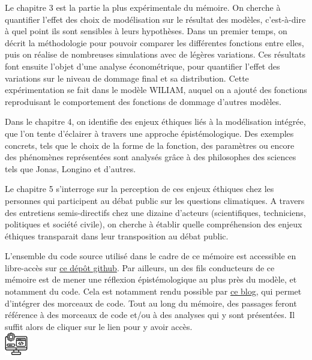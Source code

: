 Le chapitre 3 est la partie la plus expérimentale du mémoire. On cherche à quantifier l'effet des choix de modélisation sur le résultat des modèles, c'est-à-dire à quel point ils sont sensibles à leurs hypothèses. Dans un premier temps, on décrit la méthodologie pour pouvoir comparer les différentes fonctions entre elles, puis on réalise de nombreuses simulations avec de légères variations. Ces résultats font ensuite l'objet d'une analyse économétrique, pour quantifier l'effet des variations sur le niveau de dommage final et sa distribution. Cette expérimentation se fait dans le modèle WILIAM, auquel on a ajouté des fonctions reproduisant le comportement des fonctions de dommage d'autres modèles.

Dans le chapitre 4, on identifie des enjeux éthiques liés à la modélisation intégrée, que l'on tente d'éclairer à travers une approche épistémologique. Des exemples concrets, tels que le choix de la forme de la fonction, des paramètres ou encore des phénomènes représentées sont analysés grâce à des philosophes des sciences tels que Jonas, Longino et d'autres. 


Le chapitre 5 s'interroge sur la perception de ces enjeux éthiques chez les personnes qui participent au débat public sur les questions climatiques. A travers des entretiens semis-directifs chez une dizaine d'acteurs (scientifiques, techniciens, politiques et société civile), on cherche à établir quelle compréhension des enjeux éthiques transparait dans leur transposition au débat public. 

\begin{tcolorbox}[title=Avertissement]
    L'ensemble du code source utilisé dans le cadre de ce mémoire est accessible en libre-accès sur \href{https://github.com/ggenelot/damage-functions-modeling}{ce dépôt github}. Par ailleurs, un des fils conducteurs de ce mémoire est de mener une réflexion épistémologique au plus près du modèle, et notamment du code. Cela est notamment rendu possible par \href{https://damage-functions-modeling.readthedocs.io/en/latest/index.html}{ce blog}, qui permet d'intégrer des morceaux de code. Tout au long du mémoire, des passages feront référence à des morceaux de code et/ou à des analyses qui y sont présentées. Il suffit alors de cliquer sur le lien pour y avoir accès. \\


    \includegraphics[width=1cm]{figures/logos/development.png}


    
\end{tcolorbox}


